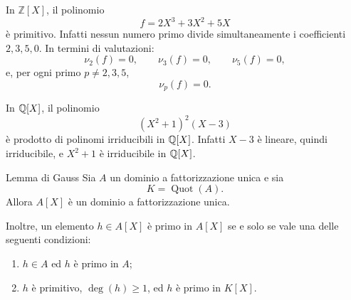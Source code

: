 \documentclass[a4paper]{article}
\begin{document}
\begin{radioactive}
\begin{snippetexample}{}
    In \(\mathbb{Z}[X]\), il polinomio
    \[
        f=2X^3+3X^2+5X
    \]
    è primitivo. Infatti nessun numero primo divide simultaneamente i coefficienti \(2,3,5,0\).
    In termini di valutazioni:
    \[
        \nu_2(f)=0,
        \qquad
        \nu_3(f)=0,
        \qquad
        \nu_5(f)=0,
    \]
    e, per ogni primo \(p\neq 2,3,5\),
    \[
        \nu_p(f)=0.
    \]
\end{snippetexample}
\end{radioactive}

\begin{radioactive}
\begin{snippetexample}{}
    In \(\mathbb{Q}[X]\), il polinomio
    \[
        (X^2+1)^2(X-3)
    \]
    è prodotto di polinomi irriducibili in \(\mathbb{Q}[X]\).
    Infatti \(X-3\) è lineare, quindi irriducibile, e \(X^2+1\) è irriducibile in \(\mathbb{Q}[X]\).
\end{snippetexample}
\end{radioactive}

\begin{radioactive}
\begin{snippettheorem}{Lemma di Gauss}
    Sia \(A\) un dominio a fattorizzazione unica e sia
    \[
        K=\operatorname{Quot}(A).
    \]
    Allora \(A[X]\) è un dominio a fattorizzazione unica.

    Inoltre, un elemento \(h\in A[X]\) è primo in \(A[X]\) se e solo se vale una delle seguenti condizioni:
    \begin{enumerate}
        \item \(h\in A\) ed \(h\) è primo in \(A\);
        \item \(h\) è primitivo, \(\deg(h)\geq 1\), ed \(h\) è primo in \(K[X]\).
    \end{enumerate}
\end{snippettheorem}
\end{radioactive}
\end{document}
